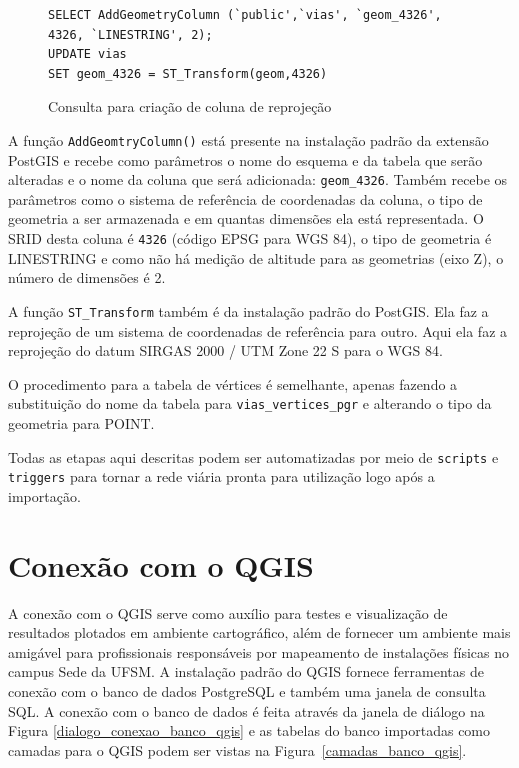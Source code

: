 \documentclass[oneside,openright,12pt]{ufsm_2015} %
\begin{document}
\begin{figure}[h!]
\center
      \caption{Consulta para criação de coluna de reprojeção}
    \label{codigo:coluna_reprojecao}
    \begin{lstlisting}
SELECT AddGeometryColumn (`public',`vias', `geom_4326', 4326, `LINESTRING', 2);
UPDATE vias
SET geom_4326 = ST_Transform(geom,4326)
\end{lstlisting}
\end{figure}


A função {\tt AddGeomtryColumn()} está presente na instalação padrão da extensão PostGIS e recebe como parâmetros o nome do esquema e da tabela que serão alteradas e o nome da coluna que será adicionada: {\tt geom\_4326}. 
Também recebe os parâmetros como o sistema de referência de coordenadas da coluna, o tipo de geometria a ser armazenada e em quantas dimensões ela está representada. 
O SRID desta coluna é {\tt 4326} (código EPSG para WGS 84), o tipo de geometria é LINESTRING e como não há medição de altitude para as geometrias (eixo Z), o número de dimensões é 2.

A função {\tt ST\_Transform} também é da instalação padrão do PostGIS. 
Ela faz a reprojeção de um sistema de coordenadas de referência para outro. 
Aqui ela faz a reprojeção do datum SIRGAS 2000 / UTM Zone 22 S para o WGS 84.

O procedimento para a tabela de vértices é semelhante, apenas fazendo a substituição do nome da tabela para {\tt vias\_vertices\_pgr} e alterando o tipo da geometria para POINT.

Todas as etapas aqui descritas podem ser automatizadas por meio de {\tt scripts} e {\tt triggers} para tornar a rede viária pronta para utilização logo após a importação.

\section{Conexão com o QGIS}


A conexão com o QGIS serve como auxílio para testes e visualização de resultados plotados em ambiente cartográfico, além de fornecer um ambiente mais amigável para profissionais responsáveis por mapeamento de instalações físicas no campus Sede da UFSM. 
A instalação padrão do QGIS fornece ferramentas de conexão com o banco de dados PostgreSQL e também uma janela de consulta SQL. 
A conexão com o banco de dados é feita através da janela de diálogo na Figura \ref{dialogo_conexao_banco_qgis} e as tabelas do banco importadas como camadas para o QGIS podem ser vistas na Figura~\ref{camadas_banco_qgis}. 
\end{document}
